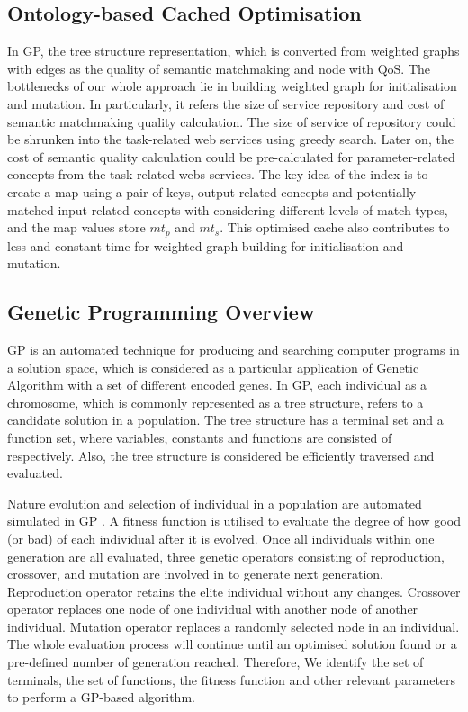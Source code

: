 \subsection{Ontology-based Cached Optimisation} \label{indexCache}
In GP, the tree structure representation, which is converted from weighted graphs with edges as the quality of semantic matchmaking and node with QoS. The bottlenecks of our whole approach lie in building weighted graph for initialisation and mutation. In particularly, it refers the size of service repository and cost of semantic matchmaking quality calculation. The size of service of repository could be shrunken into the task-related web services using greedy search. Later on, the cost of semantic quality calculation could be pre-calculated for parameter-related concepts from the task-related webs services. The key idea of the index is to create a map using a pair of keys, output-related concepts and potentially matched input-related concepts with considering different levels of match types, and the map values store $mt_{p}$ and $mt_{s}$. This optimised cache also contributes to less and constant time for weighted graph building for initialisation and mutation.



\subsection{Genetic Programming Overview}\label{problem}

GP \cite{koza1992genetic} is an automated technique for producing and searching computer programs in a solution space, which is considered as a particular application of Genetic Algorithm with a set of different encoded genes.  In GP, each individual as a chromosome, which is commonly represented as a tree structure, refers to a candidate solution in a population. The tree structure has a terminal set and a function set, where variables, constants and functions are consisted of respectively. Also,  the tree structure is considered be efficiently traversed and evaluated.

Nature evolution and selection of individual in a population are automated simulated in GP \cite{koza1992genetic}. A fitness function is utilised to evaluate the degree of how good (or bad) of each individual after it is evolved. Once all individuals within one generation are all evaluated, three genetic operators consisting of reproduction, crossover, and mutation are involved in to generate next generation. Reproduction operator retains the elite individual without any changes. Crossover operator replaces one node of one individual with another node of another individual. Mutation operator replaces a randomly selected node in an individual. The whole evaluation process will continue until an optimised solution found or a pre-defined number of generation reached. Therefore, We identify the set of terminals, the set of functions, the fitness function and other relevant parameters to perform a GP-based algorithm.

